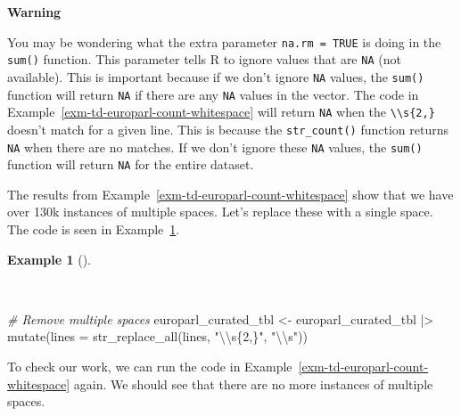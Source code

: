 \documentclass[
  letterpaper,
  DIV=11,
  numbers=noendperiod]{scrreport}
\newenvironment{Shaded}{\begin{snugshade}}{\end{snugshade}}
\newcommand{\AttributeTok}[1]{\textcolor[rgb]{0.00,0.00,0.00}{#1}}
\newcommand{\CommentTok}[1]{\textcolor[rgb]{0.00,0.00,0.00}{\textit{#1}}}
\newcommand{\FunctionTok}[1]{\textcolor[rgb]{0.00,0.00,0.00}{#1}}
\newcommand{\NormalTok}[1]{\textcolor[rgb]{0.00,0.00,0.00}{#1}}
\newcommand{\OtherTok}[1]{\textcolor[rgb]{0.00,0.00,0.00}{#1}}
\newcommand{\SpecialCharTok}[1]{\textcolor[rgb]{0.00,0.00,0.00}{#1}}
\newcommand{\StringTok}[1]{\textcolor[rgb]{0.00,0.00,0.00}{#1}}
\theoremstyle{definition}
\newtheorem{example}{Example}[chapter]
\theoremstyle{remark}
\begin{document}
\begin{tcolorbox}[enhanced jigsaw, leftrule=.75mm, bottomrule=.15mm, opacityback=0, breakable, left=2mm, colback=white, toprule=.15mm, arc=.35mm, rightrule=.15mm]

\textbf{ Warning}

You may be wondering what the extra parameter \texttt{na.rm\ =\ TRUE} is
doing in the \texttt{sum()} function. This parameter tells R to ignore
values that are \texttt{NA} (not available). This is important because
if we don't ignore \texttt{NA} values, the \texttt{sum()} function will
return \texttt{NA} if there are any \texttt{NA} values in the vector.
The code in Example~\ref{exm-td-europarl-count-whitespace} will return
\texttt{NA} when the \texttt{\textbackslash{}\textbackslash{}s\{2,\}}
doesn't match for a given line. This is because the
\texttt{str\_count()} function returns \texttt{NA} when there are no
matches. If we don't ignore these \texttt{NA} values, the \texttt{sum()}
function will return \texttt{NA} for the entire dataset.

\end{tcolorbox}

The results from Example~\ref{exm-td-europarl-count-whitespace} show
that we have over 130k instances of multiple spaces. Let's replace these
with a single space. The code is seen in
Example~\ref{exm-td-europarl-remove-multiple-whitespace}.

\begin{example}[]\protect\hypertarget{exm-td-europarl-remove-multiple-whitespace}{}\label{exm-td-europarl-remove-multiple-whitespace}

~

\begin{Shaded}
\begin{Highlighting}[]
\CommentTok{\# Remove multiple spaces}
\NormalTok{europarl\_curated\_tbl }\OtherTok{\textless{}{-}} 
\NormalTok{  europarl\_curated\_tbl }\SpecialCharTok{|\textgreater{}}
  \FunctionTok{mutate}\NormalTok{(}\AttributeTok{lines =} \FunctionTok{str\_replace\_all}\NormalTok{(lines, }\StringTok{"}\SpecialCharTok{\textbackslash{}\textbackslash{}}\StringTok{s\{2,\}"}\NormalTok{, }\StringTok{"}\SpecialCharTok{\textbackslash{}\textbackslash{}}\StringTok{s"}\NormalTok{))}
\end{Highlighting}
\end{Shaded}

\end{example}

To check our work, we can run the code in
Example~\ref{exm-td-europarl-count-whitespace} again. We should see that
there are no more instances of multiple spaces.
\end{document}
